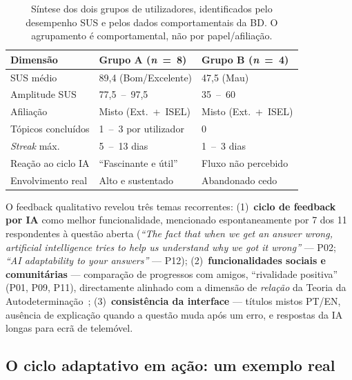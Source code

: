 \begin{table}[htbp]
	\centering
	\small
	\begin{tabular}{p{4cm} p{4cm} p{4cm}}
		\toprule
		\textbf{Dimensão} & \textbf{Grupo A} (\emph{n}~=~8) & \textbf{Grupo B} (\emph{n}~=~4) \\
		\midrule
		SUS médio           & 89,4 (Bom/Excelente)       & 47,5 (Mau) \\
		Amplitude SUS       & 77,5~--~97,5               & 35~--~60 \\
		Afiliação           & Misto (Ext.~+~ISEL)        & Misto (Ext.~+~ISEL) \\
		Tópicos concluídos  & 1~--~3 por utilizador      & 0 \\
		\emph{Streak} máx.  & 5~--~13 dias               & 1~--~3 dias \\
		Reação ao ciclo IA  & ``Fascinante e útil''      & Fluxo não percebido \\
		Envolvimento real   & Alto e sustentado          & Abandonado cedo \\
		\bottomrule
	\end{tabular}
	\caption[Comparação dos dois grupos de utilizadores identificados]{Síntese dos dois grupos de utilizadores, identificados pelo desempenho SUS e pelos dados comportamentais da BD. O agrupamento é comportamental, não por papel/afiliação.}
	\label{tab:dois-grupos}
\end{table}

O feedback qualitativo revelou três temas recorrentes: (1)~\textbf{ciclo de feedback por IA} como melhor funcionalidade, mencionado espontaneamente por 7 dos 11 respondentes à questão aberta (\emph{``The fact that when we get an answer wrong, artificial intelligence tries to help us understand why we got it wrong''} --- P02; \emph{``AI adaptability to your answers''} --- P12); (2)~\textbf{funcionalidades sociais e comunitárias} --- comparação de progressos com amigos, ``rivalidade positiva'' (P01, P09, P11), directamente alinhado com a dimensão de \emph{relação} da Teoria da Autodeterminação~\cite{deci1985intrinsic}; (3)~\textbf{consistência da interface} --- títulos mistos PT/EN, ausência de explicação quando a questão muda após um erro, e respostas da IA longas para ecrã de telemóvel.

\subsection{O ciclo adaptativo em ação: um exemplo real}
\label{sec:dois-grupos}\label{ssec:dois-grupos}\label{ssec:exemplo-conversa}

